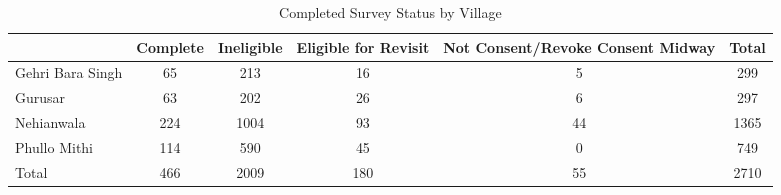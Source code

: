 \begin{table}[htbp]\centering
\caption{Completed Survey Status by Village\label{tab1-progress-byvillage}}
\begin{tabular}{l*{5}{c}}
\toprule
                    &    Complete&  Ineligible&Eligible for Revisit&Not Consent/Revoke Consent Midway&       Total\\
\midrule
Gehri Bara Singh    &          65&         213&          16&           5&         299\\
Gurusar             &          63&         202&          26&           6&         297\\
Nehianwala          &         224&        1004&          93&          44&        1365\\
Phullo Mithi        &         114&         590&          45&           0&         749\\
Total               &         466&        2009&         180&          55&        2710\\
\bottomrule
\end{tabular}
\end{table}
